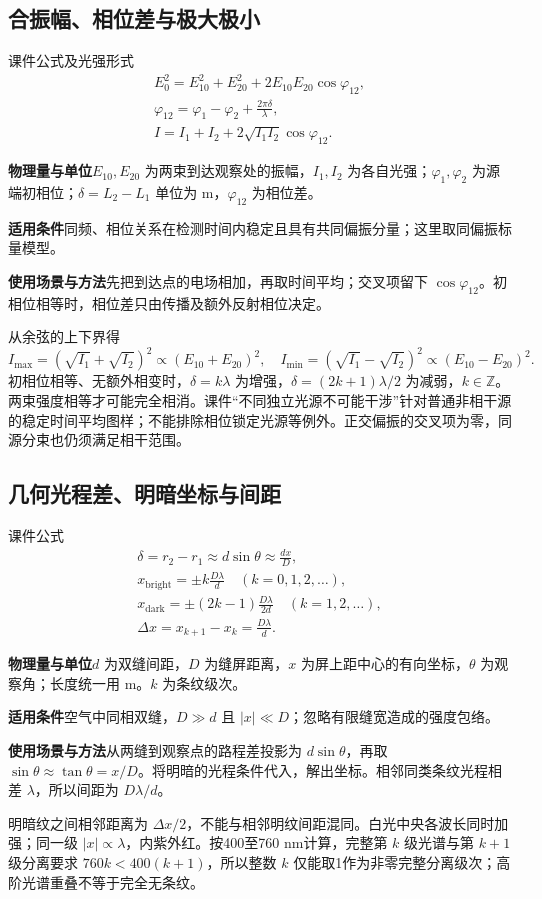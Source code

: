 \documentclass[UTF8,fontset=none,zihao=-4,a4paper]{ctexart}
\newcommand{\explain}[3]{\par\noindent\textbf{物理量与单位}\quad #1\par
\noindent\textbf{适用条件}\quad #2\par
\noindent\textbf{使用场景与方法}\quad #3\par}
\begin{document}
\subsection{合振幅、相位差与极大极小}
\begin{infobox}[breakable=false]{课件公式及光强形式}
\begin{gather*}
 E_0^2=E_{10}^2+E_{20}^2+2E_{10}E_{20}\cos\varphi_{12},\\
 \varphi_{12}=\varphi_1-\varphi_2+\frac{2\pi\delta}{\lambda},\\
 I=I_1+I_2+2\sqrt{I_1I_2}\cos\varphi_{12}.
\end{gather*}
\end{infobox}
\explain{$E_{10},E_{20}$ 为两束到达观察处的振幅，$I_1,I_2$ 为各自光强；$\varphi_1,\varphi_2$ 为源端初相位；$\delta=L_2-L_1$ 单位为 m，$\varphi_{12}$ 为相位差。}{同频、相位关系在检测时间内稳定且具有共同偏振分量；这里取同偏振标量模型。}{先把到达点的电场相加，再取时间平均；交叉项留下 $\cos\varphi_{12}$。初相位相等时，相位差只由传播及额外反射相位决定。}
从余弦的上下界得
\[
 I_{\max}=(\sqrt{I_1}+\sqrt{I_2})^2\propto(E_{10}+E_{20})^2,
 \quad I_{\min}=(\sqrt{I_1}-\sqrt{I_2})^2\propto(E_{10}-E_{20})^2.
\]
初相位相等、无额外相变时，$\delta=k\lambda$ 为增强，$\delta=(2k+1)\lambda/2$ 为减弱，$k\in\mathbb Z$。两束强度相等才可能完全相消。课件“不同独立光源不可能干涉”针对普通非相干源的稳定时间平均图样；不能排除相位锁定光源等例外。正交偏振的交叉项为零，同源分束也仍须满足相干范围。

\subsection{几何光程差、明暗坐标与间距}
\begin{infobox}[breakable=false]{课件公式}
\begin{gather*}
 \delta=r_2-r_1\approx d\sin\theta\approx\frac{dx}{D},\\
 x_{\mathrm{bright}}=\pm k\frac{D\lambda}{d}\quad(k=0,1,2,\ldots),\\
 x_{\mathrm{dark}}=\pm(2k-1)\frac{D\lambda}{2d}\quad(k=1,2,\ldots),\\
 \Delta x=x_{k+1}-x_k=\frac{D\lambda}{d}.
\end{gather*}
\end{infobox}
\explain{$d$ 为双缝间距，$D$ 为缝屏距离，$x$ 为屏上距中心的有向坐标，$\theta$ 为观察角；长度统一用 m。$k$ 为条纹级次。}{空气中同相双缝，$D\gg d$ 且 $|x|\ll D$；忽略有限缝宽造成的强度包络。}{从两缝到观察点的路程差投影为 $d\sin\theta$，再取 $\sin\theta\approx\tan\theta=x/D$。将明暗的光程条件代入，解出坐标。相邻同类条纹光程相差 $\lambda$，所以间距为 $D\lambda/d$。}
明暗纹之间相邻距离为 $\Delta x/2$，不能与相邻明纹间距混同。白光中央各波长同时加强；同一级 $|x|\propto\lambda$，内紫外红。按400至760 nm计算，完整第 $k$ 级光谱与第 $k+1$ 级分离要求 $760k<400(k+1)$，所以整数 $k$ 仅能取1作为非零完整分离级次；高阶光谱重叠不等于完全无条纹。
\end{document}
